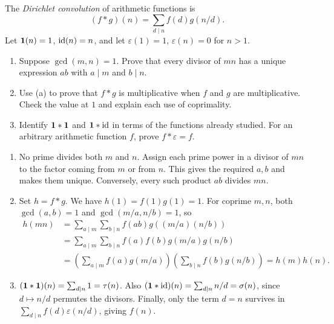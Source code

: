 \instructorbreak
{}
The \emph{Dirichlet convolution} of arithmetic functions is
\[
  (f*g)(n)=\sum_{d\mid n}f(d)g(n/d).
\]
Let $\mathbf{1}(n)=1$, $\operatorname{id}(n)=n$, and let $\varepsilon(1)=1$,
$\varepsilon(n)=0$ for $n>1$.
\begin{enumerate}
  \item Suppose $\gcd(m,n)=1$. Prove that every divisor of $mn$
  has a unique expression $ab$ with $a\mid m$ and $b\mid n$.
  \item Use (a) to prove that $f*g$ is multiplicative when $f$ and
  $g$ are multiplicative. Check the value at $1$ and explain each use
  of coprimality. 
  \item Identify $\mathbf{1}*\mathbf{1}$ and $\mathbf{1}*\operatorname{id}$ in terms of the
  functions already studied. For an arbitrary arithmetic function $f$,
  prove $f*\varepsilon=f$. 
\end{enumerate}
\begin{solution}
\begin{enumerate}
  \item No prime divides both $m$ and $n$. Assign each prime power in
  a divisor of $mn$ to the factor coming from $m$ or from $n$.
  This gives the required $a,b$ and makes them unique. Conversely,
  every such product $ab$ divides $mn$.
  \item Set $h=f*g$. We have $h(1)=f(1)g(1)=1$. For coprime $m,n$,
  both $\gcd(a,b)=1$ and $\gcd(m/a,n/b)=1$, so
  \[
  \begin{aligned}
    h(mn)&=\sum_{a\mid m}\sum_{b\mid n}f(ab)g((m/a)(n/b))\\
      &=\sum_{a\mid m}\sum_{b\mid n}f(a)f(b)g(m/a)g(n/b)\\
      &=\left(\sum_{a\mid m}f(a)g(m/a)\right)
        \left(\sum_{b\mid n}f(b)g(n/b)\right)=h(m)h(n).
  \end{aligned}
  \]
  \item $(\mathbf{1}*\mathbf{1})(n)=\sum_{d\mid n}1=\tau(n)$.
  Also $(\mathbf{1}*\operatorname{id})(n)=\sum_{d\mid n}n/d=\sigma(n)$, since
  $d\mapsto n/d$ permutes the divisors. Finally, only the term $d=n$
  survives in $\sum_{d\mid n}f(d)\varepsilon(n/d)$, giving $f(n)$.
\end{enumerate}
\end{solution}

